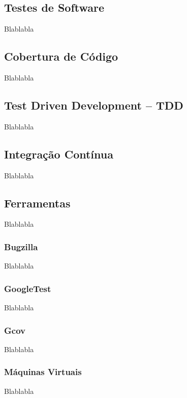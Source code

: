 \documentclass[11.5pt]{article}
\begin{document}
\subsection{Testes de Software}
Blablabla


\subsection{Cobertura de Código}
Blablabla


\subsection{Test Driven Development -- TDD}
Blablabla


\subsection{Integração Contínua}
Blablabla


\subsection{Ferramentas}
Blablabla

\subsubsection{Bugzilla}
Blablabla

\subsubsection{GoogleTest}
Blablabla

\subsubsection{Gcov}
Blablabla

\subsubsection{Máquinas Virtuais}
Blablabla
\end{document}
